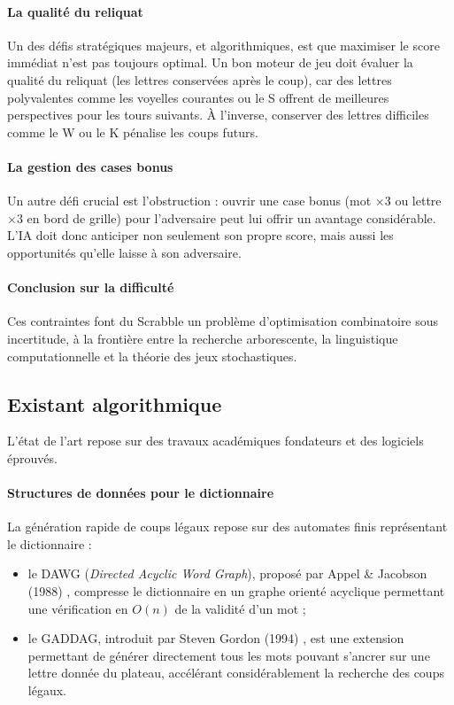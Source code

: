 \documentclass[a4paper]{article}
\begin{document}
    \paragraph{La qualité du reliquat}
    Un des défis stratégiques majeurs, et algorithmiques, est que maximiser le score immédiat n'est pas toujours optimal. Un bon moteur de jeu doit évaluer la qualité du reliquat (les lettres conservées après le coup), car des lettres polyvalentes comme les voyelles courantes ou le S offrent de meilleures perspectives pour les tours suivants. À l'inverse, conserver des lettres difficiles comme le W ou le K pénalise les coups futurs.

    \paragraph{La gestion des cases bonus}
    Un autre défi crucial est l'obstruction : ouvrir une case bonus (mot $\times 3$ ou lettre $\times 3$ en bord de grille) pour l'adversaire peut lui offrir un avantage considérable. L'IA doit donc anticiper non seulement son propre score, mais aussi les opportunités qu'elle laisse à son adversaire.

    \paragraph{Conclusion sur la difficulté}
    Ces contraintes font du Scrabble un problème d'optimisation combinatoire sous incertitude, à la frontière entre la recherche arborescente, la linguistique computationnelle et la théorie des jeux stochastiques.


    \subsection{Existant algorithmique}
    L'état de l'art repose sur des travaux académiques fondateurs et des logiciels éprouvés.

    \paragraph{Structures de données pour le dictionnaire}
    La génération rapide de coups légaux repose sur des automates finis représentant le dictionnaire :
	\begin{itemize}
        \item le DAWG (\textit{Directed Acyclic Word Graph}), proposé par Appel \& Jacobson (1988) \cite{10.1145/42411.42420}, compresse le dictionnaire en un graphe orienté acyclique permettant une vérification en $O(n)$ de la validité d'un mot ;
        \item le GADDAG, introduit par Steven Gordon (1994) \cite{10.1002/spe.4380240205}, est une extension permettant de générer directement tous les mots pouvant s'ancrer sur une lettre donnée du plateau, accélérant considérablement la recherche des coups légaux.
	\end{itemize}
\end{document}
